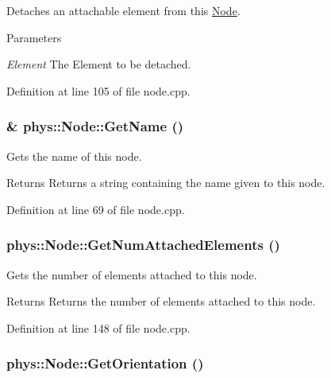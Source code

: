 Detaches an attachable element from this \hyperlink{classphys_1_1Node}{Node}. 


\begin{DoxyParams}{Parameters}
\item[{\em Element}]The Element to be detached. \end{DoxyParams}


Definition at line 105 of file node.cpp.

\hypertarget{classphys_1_1Node_a2c834fe00f2f80aa6c0bb62648f9bdb5}{
\subsubsection[{GetName}]{ \& phys::Node::GetName ()}}
\label{d0/ddc/classphys_1_1Node_a2c834fe00f2f80aa6c0bb62648f9bdb5}


Gets the name of this node. 

\begin{DoxyReturn}{Returns}
Returns a string containing the name given to this node. 
\end{DoxyReturn}


Definition at line 69 of file node.cpp.

\hypertarget{classphys_1_1Node_ae4ee282575f7b1e6bb9dfcda15fcfd47}{
\subsubsection[{GetNumAttachedElements}]{ phys::Node::GetNumAttachedElements ()}}
\label{d0/ddc/classphys_1_1Node_ae4ee282575f7b1e6bb9dfcda15fcfd47}


Gets the number of elements attached to this node. 

\begin{DoxyReturn}{Returns}
Returns the number of elements attached to this node. 
\end{DoxyReturn}


Definition at line 148 of file node.cpp.

\hypertarget{classphys_1_1Node_af9bda096f298c0ae692d52dd3b7c3733}{
\subsubsection[{GetOrientation}]{ phys::Node::GetOrientation ()}}
\label{d0/ddc/classphys_1_1Node_af9bda096f298c0ae692d52dd3b7c3733}


